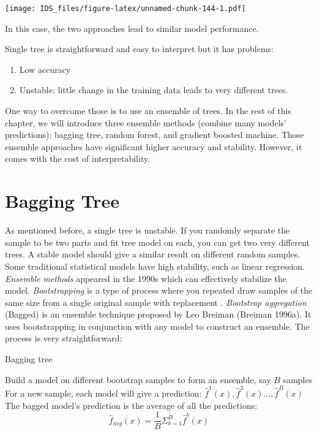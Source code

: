 \documentclass[
  12pt,
]{krantz}
\providecommand{\tightlist}{%
  \setlength{\itemsep}{0pt}\setlength{\parskip}{0pt}}
\begin{document}
\texttt{[image: IDS\_files/figure-latex/unnamed-chunk-144-1.pdf]}

In this case, the two approaches lead to similar model performance.

Single tree is straightforward and easy to interpret but it has problems:

\begin{enumerate}
\def\labelenumi{\arabic{enumi}.}
\tightlist
\item
  Low accuracy
\item
  Unstable: little change in the training data leads to very different trees.
\end{enumerate}

One way to overcome those is to use an ensemble of trees. In the rest of this chapter, we will introduce three ensemble methods (combine many models' predictions): bagging tree, random forest, and gradient boosted machine. Those ensemble approaches have significant higher accuracy and stability. However, it comes with the cost of interpretability.

\hypertarget{bagging-tree-1}{%
\section{Bagging Tree}\label{bagging-tree-1}}

As mentioned before, a single tree is unstable. If you randomly separate the sample to be two parts and fit tree model on each, you can get two very different trees. A stable model should give a similar result on different random samples. Some traditional statistical models have high stability, such as linear regression. \emph{Ensemble methods} appeared in the 1990s which can effectively stabilize the model. \emph{Bootstrapping} is a type of process where you repeated draw samples of the same size from a single original sample with replacement \citep{Efron1986}. \emph{Bootstrap aggregation} (Bagged) is an ensemble technique proposed by Leo Breiman (Breiman 1996a). It uses bootstrapping in conjunction with any model to construct an ensemble. The process is very straightforward:

\begin{algorithm}
\caption{Bagging tree}\label{baggingtreealgorithm} 
\begin{algorithmic}[1] 
\State Build a model on different bootstrap samples to form an ensemble, say $B$ samples
\State For a new sample, each model will give a prediction: $\hat{f}^1(x),\hat{f}^2(x)\dots,\hat{f}^B(x)$
\State The bagged model's prediction is the average of all the predictions: $$\hat{f}_{avg}(x)=\frac{1}{B}\Sigma^B_{b=1}\hat{f}^b(x)$$
\end{algorithmic}
\end{algorithm}
\end{document}
